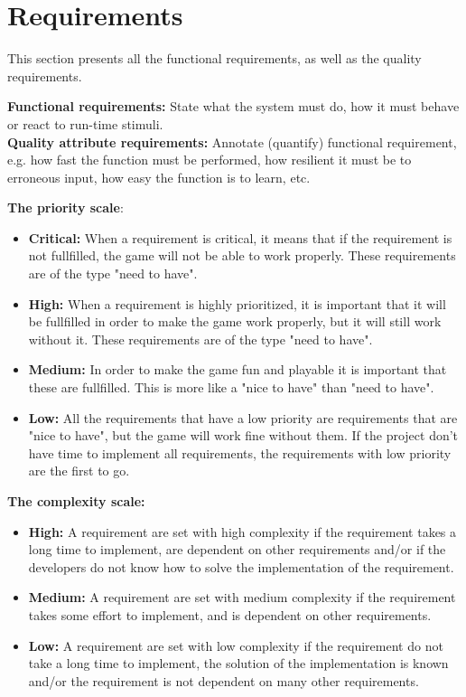 \section{Requirements}

This section presents all the functional requirements, as well as the quality requirements.

{\bf Functional requirements:} State what the system must do, how it must behave or react 
to run-time stimuli. \cite{functionalRequirement} \\
{\bf Quality attribute requirements:} Annotate (quantify) functional requirement, e.g. how fast 
the function must be performed, how resilient it must be to erroneous input, how easy the 
function is to learn, etc. \cite{nonFunctionalRequirement}

{\bf The priority scale}:
\begin{itemize}
	\item {\bf Critical:} When a requirement is critical, it means that if the requirement is
	not fullfilled, the game will not be able to work properly. These requirements are of the
	type "need to have".
	\item {\bf High:} When a requirement is highly prioritized, it is important that it will
	be fullfilled in order to make the game work properly, but it will still work without it.
	These requirements are of the type "need to have".
	\item {\bf Medium: } In order to make the game fun and playable it is important that these are 
	fullfilled. This is more like a "nice to have" than "need to have".
	\item {\bf Low:} All the requirements that have a low priority are requirements that are "nice to have",
	but the game will work fine without them. If the project don't have time to implement all
	requirements, the requirements with low priority are the first to go.
\end{itemize}

{\bf The complexity scale:}
\begin{itemize}
	\item {\bf High:} A requirement are set with high complexity if the requirement takes a long 
	time to implement, are dependent on other requirements and/or if the developers do not know
	how to solve the implementation of the requirement.
	\item {\bf Medium:} A requirement are set with medium complexity if the requirement takes 
	some effort to implement, and is dependent on other requirements.
	\item {\bf Low:} A requirement are set with low complexity if the requirement do not take
	a long time to implement, the solution of the implementation is known and/or the requirement
	is not dependent on many other requirements.
\end{itemize}